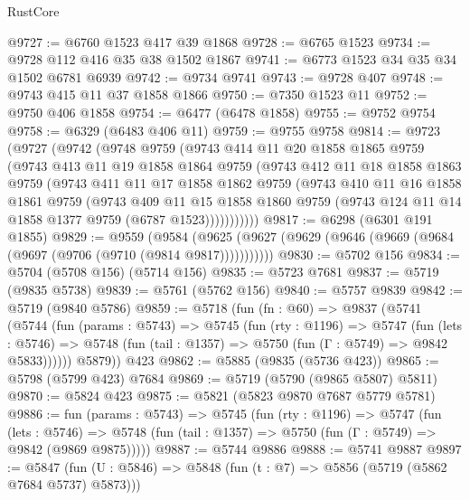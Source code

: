 \begin{lexlean}{RustCore}
\begin{coremodule}
{\begin{coremodule}
{{{{{{{{{{{{{{{{{{{{{{{{{{{{{{{{{{{{{{{{{{{{@9727 := @6760 @1523 @417 @39 @1868
@9728 := @6765 @1523
@9734 := @9728 @112 @416 @35 @38 @1502 @1867
@9741 := @6773 @1523 @34 @35 @34 @1502 @6781 @6939
@9742 := @9734 @9741
@9743 := @9728 @407
@9748 := @9743 @415 @11 @37 @1858 @1866
@9750 := @7350 @1523 @11
@9752 := @9750 @406 @1858
@9754 := @6477 (@6478 @1858)
@9755 := @9752 @9754
@9758 := @6329 (@6483 @406 @11)
@9759 := @9755 @9758
@9814 := @9723
    (@9727
      (@9742
        (@9748
          @9759
          (@9743
            @414
            @11
            @20
            @1858
            @1865
            @9759
            (@9743
              @413
              @11
              @19
              @1858
              @1864
              @9759
              (@9743
                @412
                @11
                @18
                @1858
                @1863
                @9759
                (@9743
                  @411
                  @11
                  @17
                  @1858
                  @1862
                  @9759
                  (@9743
                    @410
                    @11
                    @16
                    @1858
                    @1861
                    @9759
                    (@9743
                      @409
                      @11
                      @15
                      @1858
                      @1860
                      @9759
                      (@9743 @124 @11 @14 @1858 @1377 @9759 (@6787 @1523)))))))))))
@9817 := @6298 (@6301 @191 @1855)
@9829 := @9559
    (@9584 (@9625 (@9627 (@9629 (@9646 (@9669 (@9684 (@9697 (@9706 (@9710 (@9814 @9817)))))))))))
@9830 := @5702 @156
@9834 := @5704 (@5708 @156) (@5714 @156)
@9835 := @5723 @7681
@9837 := @5719 (@9835 @5738)
@9839 := @5761 (@5762 @156)
@9840 := @5757 @9839
@9842 := @5719 (@9840 @5786)
@9859 := @5718
    (fun (fn : @60) =>
    @9837
      (@5741
        (@5744
          (fun (params : @5743) =>
          @5745
            (fun (rty : @1196) =>
            @5747
              (fun (lets : @5746) =>
              @5748 (fun (tail : @1357) => @5750 (fun (Γ : @5749) => @9842 @5833))))))
        @5879))
    @423
@9862 := @5885 (@9835 (@5736 @423))
@9865 := @5798 (@5799 @423) @7684
@9869 := @5719 (@5790 (@9865 @5807) @5811)
@9870 := @5824 @423
@9875 := @5821 (@5823 @9870 @7687 @5779 @5781)
@9886 := fun (params : @5743) =>
  @5745
    (fun (rty : @1196) =>
    @5747
      (fun (lets : @5746) =>
      @5748 (fun (tail : @1357) => @5750 (fun (Γ : @5749) => @9842 (@9869 @9875)))))
@9887 := @5744 @9886
@9888 := @5741 @9887
@9897 := @5847 (fun (U : @5846) => @5848 (fun (t : @7) => @5856 (@5719 (@5862 @7684 @5737) @5873)))
}}}}}}}}}}}}}}}}}}}}}}}}}}}}}}}}}}}}}}}}}}}}
\end{coremodule}}
\end{coremodule}
\end{lexlean}
